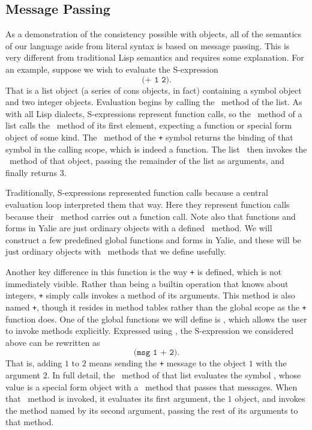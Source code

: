 \documentclass[twocolumn]{article}
\begin{document}
\subsection*{Message Passing}
As a demonstration of the consistency possible with objects, all of
the semantics of our language aside from literal syntax is based on
message passing. This is very different from traditional Lisp
semantics and requires some explanation. For an example, suppose we
wish to evaluate the S-expression
\[ \texttt{(+ 1 2)}. \] That is a list object (a series of cons
objects, in fact) containing a symbol object and two integer
objects. Evaluation begins by calling the \eval\ method of the list. As
with all Lisp dialects, S-expressions represent function calls, so the
\eval\ method of a list calls the \eval\ method of its first element,
expecting a function or special form object of some kind. The \eval\
method of the \texttt{+} symbol returns the binding of that symbol in
the calling scope, which is indeed a function. The list \eval\ then
invokes the \call\ method of that object, passing the remainder of the
list as arguments, and finally returns $3$.

Traditionally, S-expressions represented function calls because a
central evaluation loop interpreted them that way. Here they represent
function calls because their \eval\ method carries out a
function call. Note also that functions and forms in Yalie are just
ordinary objects with a defined \call\ method. We will
construct a few predefined global functions and forms in Yalie, and
these will be just ordinary objects with \call\ methods that we
define usefully.

Another key difference in this function is the way \texttt{+} is
defined, which is not immediately visible. Rather than being a builtin
operation that knows about integers, \texttt{+} simply calls invokes a
method of its arguments. This method is also named \texttt{+}, though
it resides in method tables rather than the global scope as the
\texttt{+} function does. One of the global functions we will define
is \msg, which allows the user to invoke methods explicitly. Expressed
using \msg, the S-expression we considered above can be rewritten as
\[\texttt{(msg 1 + 2)}.\]
That is, adding $1$ to $2$ means sending the \texttt{+} message to the
object $1$ with the argument $2$. In full detail, the \eval\ method of
that list evaluates the symbol \msg, whose value is a special form
object with a \call\ method that passes that messages. When that \call\
method is invoked, it evaluates its first argument, the $1$ object,
and invokes the method named by its second argument, passing the rest
of its arguments to that method.
\end{document}
